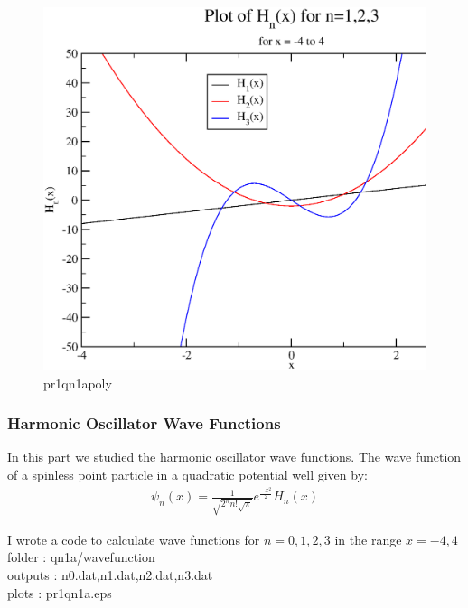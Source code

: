 \documentclass[11pt,a4paper,english]{article}
\newcommand{\beqa}{\begin{eqnarray}}
\newcommand{\eeqa}{\end{eqnarray}}
\begin{document}
	\begin{figure}[h!]
	\centering
	\includegraphics [scale=0.6]{hnx123.eps}
	\caption{pr1qn1apoly }
	\end{figure}
	\clearpage

\subsubsection{Harmonic Oscillator Wave Functions}
	
In this part we studied the harmonic oscillator wave functions. The wave function of a spinless point particle in a quadratic potential well given by:\\
\beqa
\psi_{n}(x)=\frac{1}{\sqrt{2^{n}n!\sqrt{\pi}}} e^{\frac{-x^{2}}{2}} H_{n}(x)
\eeqa

I wrote a code to calculate wave functions for $n=0,1,2,3$ in the range $x=-4,4$\\

    folder       : qn1a/wavefunction\\
	outputs      : n0.dat,n1.dat,n2.dat,n3.dat\\
	plots        : pr1qn1a.eps\\
	
\end{document}
